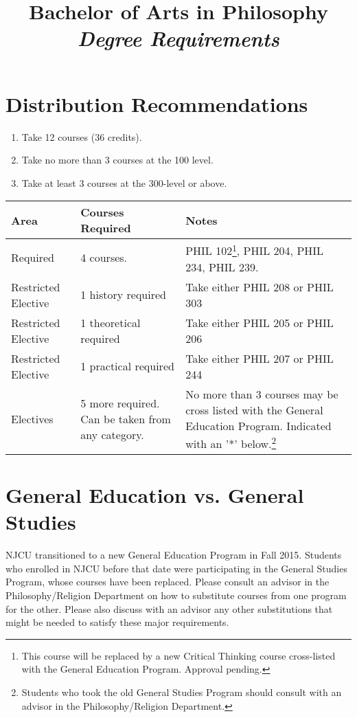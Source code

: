 \documentclass[oneside]{article}
\renewcommand{\rmdefault}{ppl}
\renewcommand{\rmdefault}{ppl}
\begin{document}
\renewcommand*\rmdefault{ppl}\normalfont\upshape

\title{Bachelor of Arts in Philosophy \\ \emph{Degree Requirements}}

\maketitle
\section*{Distribution Recommendations}
\begin{enumerate}
\item Take 12 courses (36 credits). 
\item Take no more than 3 courses at the 100 level. 
\item Take at least 3 courses at the 300-level or above. 
\end{enumerate}
\begin{center}
    \begin{tabular}{ | l | p{4cm}| p{4cm} |}
    \hline
     Area & Courses Required & Notes \\ \hline
Required & 4 courses. &  PHIL 102\footnote{This course will be replaced by a new Critical Thinking course cross-listed with the General Education Program. Approval pending.}, PHIL 204, PHIL 234, PHIL 239.  \\ \hline
Restricted Elective & 1 history required & Take either PHIL 208 or PHIL 303 \\ \hline
Restricted Elective &  1 theoretical required & Take either PHIL 205 or PHIL 206  \\ \hline
Restricted Elective & 1 practical  required & Take either PHIL 207 or PHIL 244 \\ \hline
Electives & 5 more required. Can be taken from any category. & No more than 3 courses may be cross listed with the General Education Program. Indicated with an '*' below.\footnote{Students who took the old General Studies Program should consult with an advisor in the Philosophy/Religion Department.}\\ \hline
\end{tabular}
\end{center}

\newpage

\section*{General Education vs. General Studies}
NJCU transitioned to a new General Education Program in Fall 2015. Students who enrolled in NJCU before that date were participating in the General Studies Program, whose courses have been replaced. Please consult an advisor in the Philosophy/Religion Department on how to substitute courses from one program for the other. Please also discuss with an advisor any other substitutions that might be needed to satisfy these major requirements.  
\end{document}
